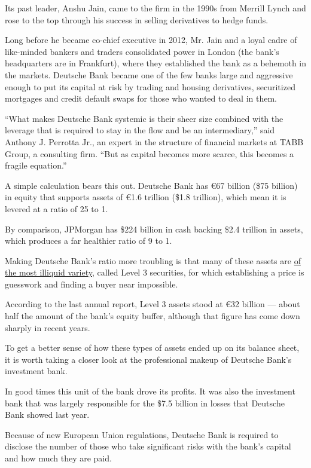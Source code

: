 Its past leader, Anshu Jain, came to the firm in the 1990s from Merrill
Lynch and rose to the top through his success in selling derivatives to
hedge funds.

Long before he became co-chief executive in 2012, Mr. Jain and a loyal
cadre of like-minded bankers and traders consolidated power in London
(the bank's headquarters are in Frankfurt), where they established the
bank as a behemoth in the markets. Deutsche Bank became one of the few
banks large and aggressive enough to put its capital at risk by trading
and housing derivatives, securitized mortgages and credit default swaps
for those who wanted to deal in them.

``What makes Deutsche Bank systemic is their sheer size combined with
the leverage that is required to stay in the flow and be an
intermediary,'' said Anthony J. Perrotta Jr., an expert in the structure
of financial markets at TABB Group, a consulting firm. ``But as capital
becomes more scarce, this becomes a fragile equation.''

A simple calculation bears this out. Deutsche Bank has €67 billion (\$75
billion) in equity that supports assets of €1.6 trillion (\$1.8
trillion), which mean it is levered at a ratio of 25 to 1.

By comparison, JPMorgan has \$224 billion in cash backing \$2.4 trillion
in assets, which produces a far healthier ratio of 9 to 1.

Making Deutsche Bank's ratio more troubling is that many of these assets
are
\href{http://www.nytimes.com/2016/06/29/business/dealbook/hard-to-sell-assets-complicate-european-banks-brexit-risks.html}{of
the most illiquid variety}, called Level 3 securities, for which
establishing a price is guesswork and finding a buyer near impossible.

According to the last annual report, Level 3 assets stood at €32 billion
--- about half the amount of the bank's equity buffer, although that
figure has come down sharply in recent years.

To get a better sense of how these types of assets ended up on its
balance sheet, it is worth taking a closer look at the professional
makeup of Deutsche Bank's investment bank.

In good times this unit of the bank drove its profits. It was also the
investment bank that was largely responsible for the \$7.5 billion in
losses that Deutsche Bank showed last year.

Because of new European Union regulations, Deutsche Bank is required to
disclose the number of those who take significant risks with the bank's
capital and how much they are paid.

